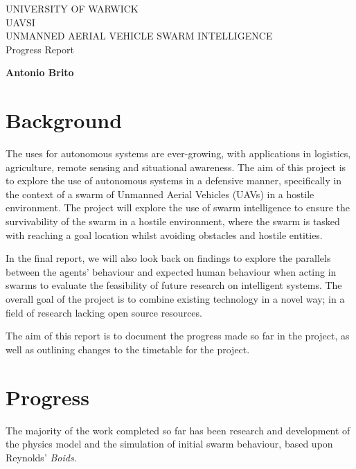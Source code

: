 \documentclass{article}
\begin{document}
\begin{titlepage}
   \begin{center}
        \large UNIVERSITY OF WARWICK\\
       \vspace*{8cm}
        \Huge UAVSI
        \\
        \vspace{0.5cm}
        \normalsize UNMANNED AERIAL VEHICLE SWARM INTELLIGENCE
        \\
        \vspace{0.2cm}
        Progress Report
            
       \vspace{5cm}

       \large \textbf{Antonio Brito}
			
			\smallskip

       \vfill

   \end{center}
\end{titlepage}


\section{Background}
The uses for autonomous systems are ever-growing, with applications in logistics, agriculture, remote sensing and situational awareness\cite{muchiri}\cite{drury}. The aim of this project is to explore the use of autonomous systems in a defensive manner, specifically in the context of a swarm of Unmanned Aerial Vehicles (UAVs) in a hostile environment. The project will explore the use of swarm intelligence to ensure the survivability of the swarm in a hostile environment, where the swarm is tasked with reaching a goal location whilst avoiding obstacles and hostile entities.

In the final report, we will also look back on findings to explore the parallels between the agents' behaviour and expected human behaviour when acting in swarms to evaluate the feasibility of future research on intelligent systems. The overall goal of the project is to combine existing technology in a novel way; in a field of research lacking open source resources.

The aim of this report is to document the progress made so far in the project, as well as outlining changes to the timetable for the project.

\section{Progress}
\label{sec:progress}
The majority of the work completed so far has been research and development of the physics model and the simulation of initial swarm behaviour, based upon Reynolds' \emph{Boids}\cite{Reynolds}.
\end{document}

